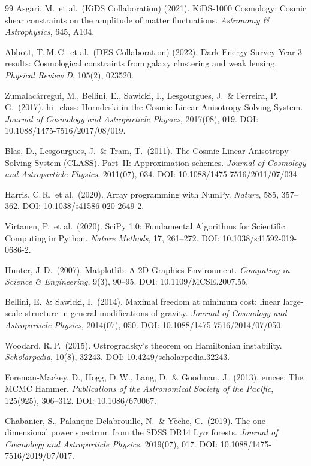 \documentclass[11pt,a4paper]{article}
\begin{document}
\begin{thebibliography}{99}
Asgari, M.\ et al.\ (KiDS Collaboration) (2021).
KiDS-1000 Cosmology: Cosmic shear constraints on the amplitude of matter fluctuations.
\textit{Astronomy \& Astrophysics}, 645, A104.

Abbott, T.\,M.\,C.\ et al.\ (DES Collaboration) (2022).
Dark Energy Survey Year 3 results: Cosmological constraints from galaxy clustering and weak lensing.
\textit{Physical Review D}, 105(2), 023520.

Zumalac\'arregui, M., Bellini, E., Sawicki, I., Lesgourgues, J.\ \& Ferreira, P.\,G.\ (2017).
hi\_class: Horndeski in the Cosmic Linear Anisotropy Solving System.
\textit{Journal of Cosmology and Astroparticle Physics}, 2017(08), 019.
DOI: 10.1088/1475-7516/2017/08/019.

Blas, D., Lesgourgues, J.\ \& Tram, T.\ (2011).
The Cosmic Linear Anisotropy Solving System (CLASS). Part~II: Approximation schemes.
\textit{Journal of Cosmology and Astroparticle Physics}, 2011(07), 034.
DOI: 10.1088/1475-7516/2011/07/034.

Harris, C.\,R.\ et al.\ (2020).
Array programming with NumPy.
\textit{Nature}, 585, 357--362.
DOI: 10.1038/s41586-020-2649-2.

Virtanen, P.\ et al.\ (2020).
SciPy 1.0: Fundamental Algorithms for Scientific Computing in Python.
\textit{Nature Methods}, 17, 261--272.
DOI: 10.1038/s41592-019-0686-2.

Hunter, J.\,D.\ (2007).
Matplotlib: A 2D Graphics Environment.
\textit{Computing in Science \& Engineering}, 9(3), 90--95.
DOI: 10.1109/MCSE.2007.55.

Bellini, E.\ \& Sawicki, I.\ (2014).
Maximal freedom at minimum cost: linear large-scale structure in general modifications of gravity.
\textit{Journal of Cosmology and Astroparticle Physics}, 2014(07), 050.
DOI: 10.1088/1475-7516/2014/07/050.

Woodard, R.\,P.\ (2015).
Ostrogradsky's theorem on Hamiltonian instability.
\textit{Scholarpedia}, 10(8), 32243.
DOI: 10.4249/scholarpedia.32243.

Foreman-Mackey, D., Hogg, D.\,W., Lang, D.\ \& Goodman, J.\ (2013).
emcee: The MCMC Hammer.
\textit{Publications of the Astronomical Society of the Pacific}, 125(925), 306--312.
DOI: 10.1086/670067.

Chabanier, S., Palanque-Delabrouille, N.\ \& Y\`eche, C.\ (2019).
The one-dimensional power spectrum from the SDSS DR14 Ly$\alpha$ forests.
\textit{Journal of Cosmology and Astroparticle Physics}, 2019(07), 017.
DOI: 10.1088/1475-7516/2019/07/017.


\end{thebibliography}
\end{document}
